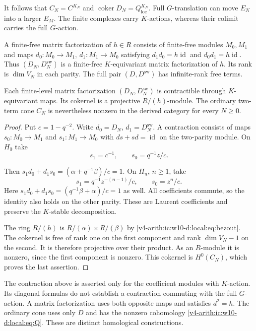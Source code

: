 It follows that $C_N=C^{K_N}$ and $\operatorname{coker} D_N=Q_{\mathrm{loc}}^{K_N}$.
Full $G$-translation can move $E_N$ into a larger $E_M$.
The finite complexes carry $K$-actions, whereas their colimit carries the full $G$-action.

A finite-free matrix factorization of $h\in R$ consists of finite-free modules $M_0,M_1$
and maps $d_0:M_0\to M_1$, $d_1:M_1\to M_0$ satisfying
$d_1d_0=h\operatorname{id}$ and $d_0d_1=h\operatorname{id}$.
Thus $(D_N,D_N^\mathrm{sw})$ is a finite-free $K$-equivariant matrix factorization of $h$.
Its rank is $\dim V_N$ in each parity.
The full pair $(D,D^\mathrm{sw})$ has infinite-rank free terms.

\begin{proposition}\label{v4-arith:ic:w10-d:local:prop:mf}
Each finite-level matrix factorization $(D_N,D_N^\mathrm{sw})$ is contractible through $K$-equivariant maps.
Its cokernel is a projective $R/(h)$-module.
The ordinary two-term cone $C_N$ is nevertheless nonzero in the derived category for every $N\ge0$.
\end{proposition}
\begin{proof}
Put $c=1-q^{-2}$.
Write $d_0=D_N$, $d_1=D_N^\mathrm{sw}$.
A contraction consists of maps $s_0:M_0\to M_1$ and $s_1:M_1\to M_0$
with $ds+sd=\operatorname{id}$ on the two-parity module.
On $H_0$ take
\[
 s_1=c^{-1},\qquad s_0=q^{-1}z/c.
\]

Then $s_1d_0+d_1s_0=(\alpha+q^{-1}\beta)/c=1$.
On $H_n$, $n\ge1$, take
\[
 s_1=q^{-1}z^{-(n-1)}/c,\qquad s_0=z^n/c.
\]
Here $s_1d_0+d_1s_0=(q^{-1}\beta+\alpha)/c=1$ as well.
All coefficients commute, so the identity also holds on the other parity.
These are Laurent coefficients and preserve the $K$-stable decomposition.

The ring $R/(h)$ is $R/(\alpha)\times R/(\beta)$ by \eqref{v4-arith:ic:w10-d:local:eq:bezout}.
The cokernel is free of rank one on the first component and rank $\dim V_N-1$ on the second.
It is therefore projective over their product.
As an $R$-module it is nonzero, since the first component is nonzero.
This cokernel is $H^0(C_N)$, which proves the last assertion.
\end{proof}

The contraction above is asserted only for the coefficient modules with $K$-action.
Its diagonal formulas do not establish a contraction commuting with the full $G$-action.
A matrix factorization uses both opposite maps and satisfies $d^2=h$.
The ordinary cone uses only $D$ and has the nonzero cohomology \eqref{v4-arith:ic:w10-d:local:eq:Q}.
These are distinct homological constructions.

